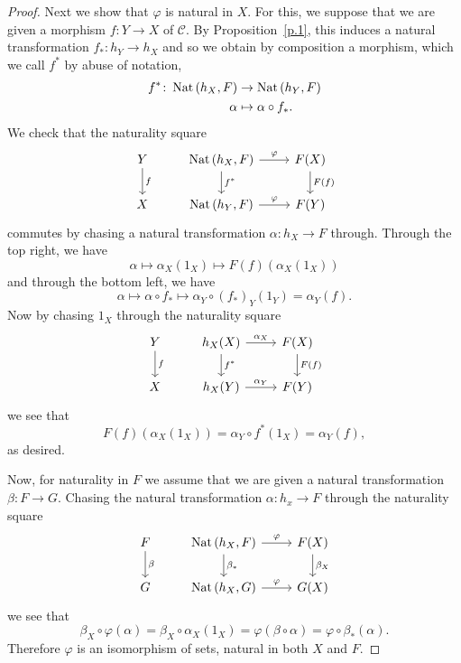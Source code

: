 \documentclass[dissertation.tex]{subfiles}
\begin{document}
\begin{lem}[Yoneda]
\begin{proof}
    Next we show that $\varphi$ is natural in $X$.
    For this, we suppose that we are given a morphism $f : Y \rightarrow X$ of $\mathscr{C}$.
    By Proposition~\ref{p.1}, this induces a natural transformation $f_* : h_Y \rightarrow h_X$ and so we obtain by composition a morphism, which we call $f^*$ by abuse of notation,
    \begin{align*}
      f^* \colon \operatorname{Nat}\left(h_X, F\right) &\rightarrow \operatorname{Nat}\left(h_Y,F\right)\\
      \alpha & \mapsto \alpha \circ f_*.
    \end{align*}
    We check that the naturality square
    $$\begin{tikzcd}
      Y\arrow{d}{f} & \Nat{h_X, F}\arrow{r}{\varphi}\arrow{d}{f^*} & F(X)\arrow{d}{F(f)}\\
      X & \Nat{h_Y, F}\arrow{r}{\varphi} & F(Y)
    \end{tikzcd}$$
    commutes by chasing a natural transformation $\alpha : h_X \rightarrow F$ through.
    Through the top right, we have
    $$\alpha \mapsto \alpha_X(1_X) \mapsto F(f)(\alpha_X(1_X))$$
    and through the bottom left, we have
    $$\alpha \mapsto \alpha \circ f_* \mapsto \alpha_Y \circ (f_*)_Y (1_Y) = \alpha_Y(f).$$
    Now by chasing $1_X$ through the naturality square
    $$\begin{tikzcd}
      Y\arrow{d}{f} & h_X(X)\arrow{r}{\alpha_X}\arrow{d}{f^*} & F(X)\arrow{d}{F(f)}\\
      X & h_X(Y)\arrow{r}{\alpha_Y} & F(Y)
    \end{tikzcd}$$
    we see that
    $$F(f)(\alpha_X(1_X)) = \alpha_Y \circ f^* (1_X) = \alpha_Y(f),$$
    as desired.

    Now, for naturality in $F$ we assume that we are given a natural transformation $\beta : F \rightarrow G$.
    Chasing the natural transformation $\alpha : h_x \rightarrow F$ through the naturality square
    $$\begin{tikzcd}
      F\arrow{d}{\beta} & \Nat{h_X, F} \arrow{r}{\varphi}\arrow{d}{\beta_*} & F(X)\arrow{d}{\beta_X} \\
      G & \Nat{h_X, G} \arrow{r}{\varphi} & G(X)
    \end{tikzcd}$$
    we see that
    $$\beta_X \circ \varphi(\alpha) = \beta_X \circ \alpha_X(1_X) = \varphi( \beta \circ \alpha) = \varphi \circ \beta_* ( \alpha).$$
    Therefore $\varphi$ is an isomorphism of sets, natural in both $X$ and $F$.
  \end{proof}
\end{lem}
\end{document}
